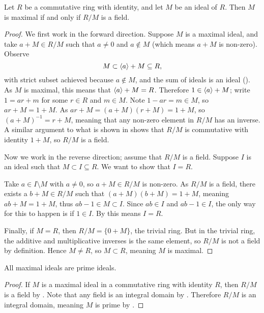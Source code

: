 \begin{theorem}\label{thrm-maximal-ideal-iff-quotient-ring-is-field}
    Let $R$ be a commutative ring with identity, and let $M$ be an ideal of $R$. Then $M$ is maximal if and only if $R/M$ is a field.
\end{theorem}
\begin{proof}
    We first work in the forward direction. Suppose $M$ is a maximal ideal, and take $a + M \in R/M$ such that $a \neq 0$ and $a \notin M$ (which means $a + M$ is non-zero). Observe
    \[
        M \subset \left\langle a\right\rangle + M \subseteq R,
    \]
    with strict subset achieved because $a \notin M$, and the sum of ideals is an ideal (). As $M$ is maximal, this means that $\left\langle a\right\rangle + M = R$. Therefore $1 \in \left\langle a\right\rangle + M$; write $1 = ar + m$ for some $r \in R$ and $m \in M$. Note $1-ar = m \in M$, so $ar + M = 1 + M$. As $ar + M = (a+M)(r+M) = 1 + M$, so $(a+M)^{-1} = r+M$, meaning that any non-zero element in $R/M$ has an inverse. A similar argument to what is shown in  shows that $R/M$ is commutative with identity $1 + M$, so $R/M$ is a field.

    Now we work in the reverse direction; assume that $R/M$ is a field. Suppose $I$ is an ideal such that $M \subset I \subseteq R$. We want to show that $I = R$.

    Take $a \in I \setminus M$ with $a \neq 0$, so $a + M \in R/M$ is non-zero. As $R/M$ is a field, there exists a $b + M \in R/M$ such that $(a+M)(b+M) = 1 + M$, meaning $ab+M = 1+M$, thus $ab - 1 \in M \subset I$. Since $ab \in I$ and $ab - 1 \in I$, the only way for this to happen is if $1 \in I$. By  this means $I = R$.

    Finally, if $M = R$, then $R/M = \{0 + M\}$, the trivial ring. But in the trivial ring, the additive and multiplicative inverses is the same element, so $R/M$ is not a field by definition. Hence $M \neq R$, so $M \subset R$, meaning $M$ is maximal.
\end{proof}

\begin{corollary}\label{corollary-all-maximal-ideals-are-prime-ideals}
    All maximal ideals are prime ideals.
\end{corollary}
\begin{proof}
    If $M$ is a maximal ideal in a commutative ring with identity $R$, then $R/M$ is a field by . Note that any field is an integral domain by . Therefore $R/M$ is an integral domain, meaning $M$ is prime by .
\end{proof}

